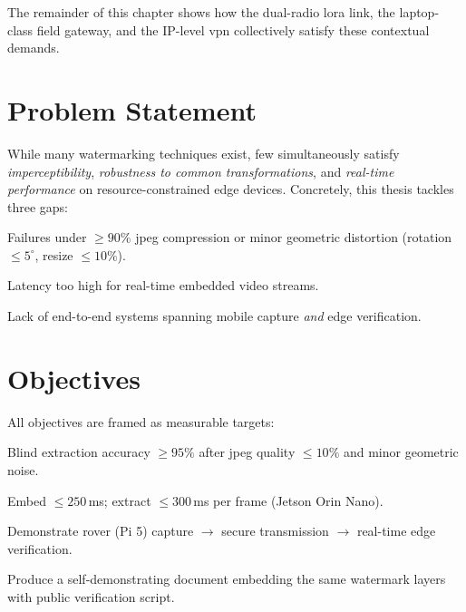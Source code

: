 \bigskip
The remainder of this chapter shows how the dual-radio \gls{lora} link, the
laptop-class field gateway, and the IP-level \gls{vpn} collectively satisfy
these contextual demands.

\section{Problem Statement}
\label{sec:intro:problem}

While many watermarking techniques exist, few simultaneously satisfy
\emph{imperceptibility}, \emph{robustness to common transformations},
and \emph{real-time performance} on resource-constrained edge devices.
Concretely, this thesis tackles three gaps:

\begin{description}[leftmargin=3.6cm,style=sameline]
  \item[\textbf{Robustness bottleneck}] Failures under $\ge 90\%$ \gls{jpeg} compression or minor geometric distortion (rotation $\le 5^{\circ}$, resize $\le 10\%$).
  \item[\textbf{Performance gap}] Latency too high for real-time embedded video streams.
  \item[\textbf{Integration gap}] Lack of end-to-end systems spanning mobile capture \emph{and} edge verification.
\end{description}

\section{Objectives}
\label{sec:intro:objectives}

All objectives are framed as measurable targets:

\begin{description}[leftmargin=3.2cm,style=sameline]
  \item[O1 Robustness] Blind extraction accuracy $\ge 95\%$ after \gls{jpeg} quality $\le 10\%$ and minor geometric noise.
  \item[O2 Latency] Embed $\le 250$\,ms; extract $\le 300$\,ms per frame (Jetson Orin Nano).
  \item[O3 Integration] Demonstrate rover (Pi 5) capture $\rightarrow$ secure transmission $\rightarrow$ real-time edge verification.
  \item[O4 Verifiability] Produce a self-demonstrating document embedding the same watermark layers with public verification script.
\end{description}

